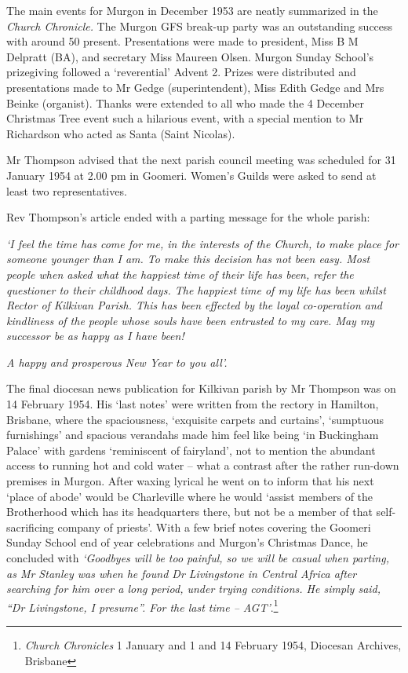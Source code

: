 The main events for Murgon in December 1953 are neatly summarized in the \emph{Church Chronicle.} The Murgon GFS break-up party was an outstanding success with around 50 present. Presentations were made to president, Miss B M Delpratt (BA), and secretary Miss Maureen Olsen. Murgon Sunday School's prizegiving followed a `reverential' Advent 2. Prizes were distributed and presentations made to Mr Gedge (superintendent), Miss Edith Gedge and Mrs Beinke (organist). Thanks were extended to all who made the 4 December Christmas Tree event such a hilarious event, with a special mention to Mr Richardson who acted as Santa (Saint Nicolas).

Mr Thompson advised that the next parish council meeting was scheduled for 31 January 1954 at 2.00 pm in Goomeri. Women's Guilds were asked to send at least two representatives.

Rev Thompson's article ended with a parting message for the whole parish:

\emph{`I feel the time has come for me, in the interests of the Church, to make place for someone younger than I am. To make this decision has not been easy. Most people when asked what the happiest time of their life has been, refer the questioner to their childhood days. The happiest time of my life has been whilst Rector of Kilkivan Parish. This has been effected by the loyal co-operation and kindliness of the people whose souls have been entrusted to my care. May my successor be as happy as I have been!}

\emph{A happy and prosperous New Year to you all'.}

The final diocesan news publication for Kilkivan parish by Mr Thompson was on 14 February 1954. His `last notes' were written from the rectory in Hamilton, Brisbane, where the spaciousness, `exquisite carpets and curtains', `sumptuous furnishings' and spacious verandahs made him feel like being `in Buckingham Palace' with gardens `reminiscent of fairyland', not to mention the abundant access to running hot and cold water -- what a contrast after the rather run-down premises in Murgon. After waxing lyrical he went on to inform that his next `place of abode' would be Charleville where he would `assist members of the Brotherhood which has its headquarters there, but not be a member of that self-sacrificing company of priests'. With a few brief notes covering the Goomeri Sunday School end of year celebrations and Murgon's Christmas Dance, he concluded with \emph{`Goodbyes will be too painful, so we will be casual when parting, as Mr Stanley was when he found Dr Livingstone in Central Africa after searching for him over a long period, under trying conditions. He simply said, ``Dr Livingstone, I presume''. For the last time -- AGT'}.\footnote{\emph{Church Chronicles} 1 January and 1 and 14 February 1954, Diocesan Archives, Brisbane}


